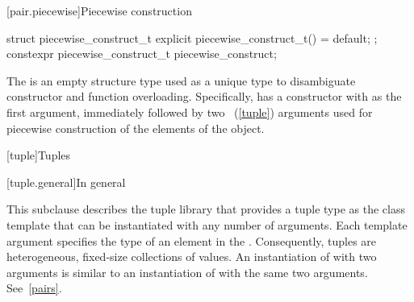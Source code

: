 [pair.piecewise]{Piecewise construction}

%
%
\begin{itemdecl}
struct piecewise_construct_t { explicit piecewise_construct_t() = default; };
constexpr piecewise_construct_t piecewise_construct{};
\end{itemdecl}

\pnum
The   is an empty structure type
used as a unique type to disambiguate constructor and function overloading. Specifically,
 has a constructor with  as the
first argument, immediately followed by two ~(\ref{tuple}) arguments used
for piecewise construction of the elements of the  object.

[tuple]{Tuples}

[tuple.general]{In general}

\pnum
{}%
This subclause describes the tuple library that provides a tuple type as
the class template  that can be instantiated with any number
of arguments. Each template argument specifies
the type of an element in the .  Consequently, tuples are
heterogeneous, fixed-size collections of values. An instantiation of  with
two arguments is similar to an instantiation of  with the same two arguments.
See~\ref{pairs}.

\pnum
{}

